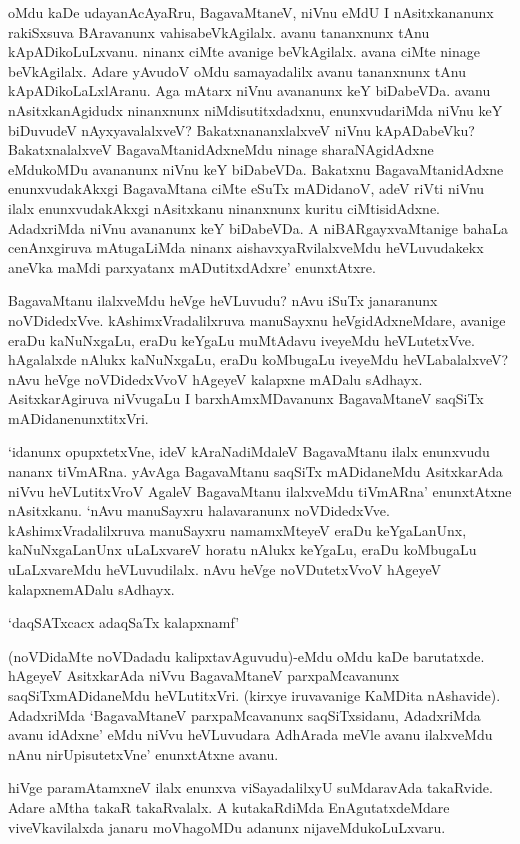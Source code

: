 oMdu kaDe udayanAcAyaRru, BagavaMtaneV, niVnu eMdU I nAsitxkananunx rakiSxsuva BAravanunx vahisabeVkAgilalx. avanu tananxnunx tAnu kApADikoLuLxvanu. ninanx ciMte avanige beVkAgilalx. avana ciMte ninage beVkAgilalx. Adare yAvudoV oMdu samayadalilx avanu tananxnunx tAnu kApADikoLaLxlAranu. Aga mAtarx niVnu avananunx keY biDabeVDa. avanu nAsitxkanAgidudx ninanxnunx niMdisutitxdadxnu, enunxvudariMda niVnu keY biDuvudeV nAyxyavalalxveV? BakatxnananxlalxveV niVnu kApADabeVku? BakatxnalalxveV BagavaMtanidAdxneMdu ninage sharaNAgidAdxne eMdukoMDu avananunx niVnu keY biDabeVDa. Bakatxnu BagavaMtanidAdxne enunxvudakAkxgi BagavaMtana ciMte eSuTx mADidanoV, adeV riVti niVnu ilalx enunxvudakAkxgi nAsitxkanu ninanxnunx kuritu ciMtisidAdxne. AdadxriMda niVnu avananunx keY biDabeVDa. A niBARgayxvaMtanige bahaLa cenAnxgiruva mAtugaLiMda ninanx aishavxyaRvilalxveMdu heVLuvudakekx aneVka maMdi parxyatanx mADutitxdAdxre' enunxtAtxre.

BagavaMtanu ilalxveMdu heVge heVLuvudu? nAvu iSuTx janaranunx noVDidedxVve. kAshimxVradalilxruva manuSayxnu heVgidAdxneMdare, avanige eraDu kaNuNxgaLu, eraDu keYgaLu muMtAdavu iveyeMdu heVLutetxVve. hAgalalxde nAlukx kaNuNxgaLu, eraDu koMbugaLu iveyeMdu heVLabalalxveV? nAvu heVge noVDidedxVvoV hAgeyeV kalapxne mADalu sAdhayx. AsitxkarAgiruva niVvugaLu I barxhAmxMDavanunx BagavaMtaneV saqSiTx mADidanenunxtitxVri.

`idanunx opupxtetxVne, ideV kAraNadiMdaleV BagavaMtanu ilalx enunxvudu nananx tiVmARna. yAvAga BagavaMtanu saqSiTx mADidaneMdu AsitxkarAda niVvu heVLutitxVroV AgaleV BagavaMtanu ilalxveMdu tiVmARna' enunxtAtxne nAsitxkanu. `nAvu manuSayxru halavaranunx noVDidedxVve. kAshimxVradalilxruva manuSayxru namamxMteyeV eraDu keYgaLanUnx, kaNuNxgaLanUnx uLaLxvareV horatu nAlukx keYgaLu, eraDu koMbugaLu uLaLxvareMdu heVLuvudilalx. nAvu heVge noVDutetxVvoV hAgeyeV kalapxnemADalu sAdhayx.

\begin{shloka}
`daqSATxcacx adaqSaTx kalapxnamf'
\end{shloka}

(noVDidaMte noVDadadu kalipxtavAguvudu)-eMdu oMdu kaDe barutatxde. hAgeyeV AsitxkarAda niVvu BagavaMtaneV parxpaMcavanunx saqSiTxmADidaneMdu heVLutitxVri. (kirxye iruvavanige KaMDita nAshavide). AdadxriMda `BagavaMtaneV parxpaMcavanunx saqSiTxsidanu, AdadxriMda avanu idAdxne' eMdu niVvu heVLuvudara AdhArada meVle avanu ilalxveMdu nAnu nirUpisutetxVne' enunxtAtxne avanu.

hiVge paramAtamxneV ilalx enunxva viSayadalilxyU suMdaravAda takaRvide. Adare aMtha takaR takaRvalalx. A kutakaRdiMda EnAgutatxdeMdare viveVkavilalxda janaru moVhagoMDu adanunx nijaveMdukoLuLxvaru.

